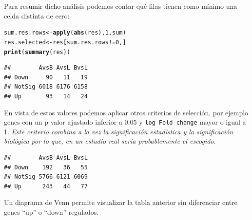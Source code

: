 \documentclass[a4paper]{article}\usepackage[]{graphicx}\usepackage[]{color}
\makeatletter
\newcommand{\hlnum}[1]{\textcolor[rgb]{0.686,0.059,0.569}{#1}}%
\newcommand{\hlopt}[1]{\textcolor[rgb]{0,0,0}{#1}}%
\newcommand{\hlstd}[1]{\textcolor[rgb]{0.345,0.345,0.345}{#1}}%
\newcommand{\hlkwb}[1]{\textcolor[rgb]{0.69,0.353,0.396}{#1}}%
\newcommand{\hlkwd}[1]{\textcolor[rgb]{0.737,0.353,0.396}{\textbf{#1}}}%
\newenvironment{kframe}{%
 \def\at@end@of@kframe{}%
 \ifinner\ifhmode%
  \def\at@end@of@kframe{\end{minipage}}%
  \begin{minipage}{\columnwidth}%
 \fi\fi%
 \def\FrameCommand##1{\hskip\@totalleftmargin \hskip-\fboxsep
 \colorbox{shadecolor}{##1}\hskip-\fboxsep
     \hskip-\linewidth \hskip-\@totalleftmargin \hskip\columnwidth}%
 \MakeFramed {\advance\hsize-\width
   \@totalleftmargin\z@ \linewidth\hsize
   \@setminipage}}%
 {\par\unskip\endMakeFramed%
 \at@end@of@kframe}
\newenvironment{knitrout}{}{} %
\makeatother
\begin{document}
Para resumir dicho análisis podemos contar qué filas tienen como mínimo una celda distinta de cero:

\begin{knitrout}
\color{fgcolor}\begin{kframe}
\begin{alltt}
\hlstd{sum.res.rows}\hlkwb{<-}\hlkwd{apply}\hlstd{(}\hlkwd{abs}\hlstd{(res),}\hlnum{1}\hlstd{,sum)}
\hlstd{res.selected}\hlkwb{<-}\hlstd{res[sum.res.rows}\hlopt{!=}\hlnum{0}\hlstd{,]}
\hlkwd{print}\hlstd{(}\hlkwd{summary}\hlstd{(res))}
\end{alltt}
\begin{verbatim}
##        AvsB AvsL BvsL
## Down     90   11   19
## NotSig 6018 6176 6158
## Up       93   14   24
\end{verbatim}
\end{kframe}
\end{knitrout}

En vista de estos valores podemos aplicar otros criterios de selección, por ejemplo genes con un p-valor ajustado inferior a 0.05 y \texttt{log Fold change} mayor o igual a 1.\emph{ Este criterio combina a la vez la significación estadística y la significación biológica por lo que, en un estudio real sería probablemente el escogido}.

\begin{knitrout}
\color{fgcolor}\begin{kframe}
\begin{verbatim}
##        AvsB AvsL BvsL
## Down    192   36   55
## NotSig 5766 6121 6069
## Up      243   44   77
\end{verbatim}
\end{kframe}
\end{knitrout}

Un diagrama de Venn permite visualizar la tabla anterior sin diferenciar entre genes ``up'' o ``down'' regulados.
\end{document}

